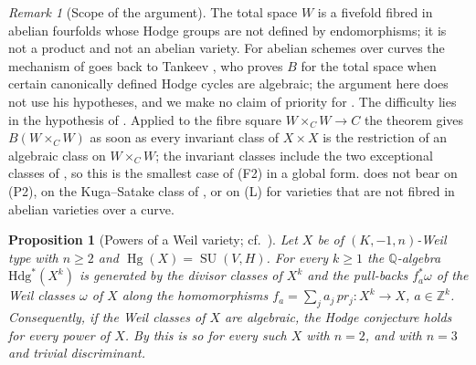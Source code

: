 \documentclass[11pt,reqno]{amsart}
\theoremstyle{plain}
\newtheorem{proposition}[theorem]{Proposition}
\theoremstyle{definition}
\theoremstyle{remark}
\newtheorem{remark}[theorem]{Remark}
\newcommand{\QQ}{\mathbb{Q}}
\newcommand{\ZZ}{\mathbb{Z}}
\newcommand{\Hdg}{\mathrm{Hdg}}
\DeclareMathOperator{\Hg}{Hg}
\DeclareMathOperator{\SU}{SU}
\begin{document}
\begin{remark}[Scope of the argument]\label{rem:newlefschetzscope}
The total space $W$ is a fivefold fibred in abelian fourfolds whose Hodge
groups are not defined by endomorphisms; it is not a product and not an
abelian variety. For abelian schemes over curves the mechanism of
 goes back to Tankeev \cite{Tan03}, who proves $B$
for the total space when certain canonically defined Hodge cycles are
algebraic; the argument here does not use his hypotheses, and we make no
claim of priority for . The difficulty lies in the hypothesis of
.
Applied to the fibre square $W\times_{C}W\to C$ the theorem gives
$B(W\times_{C}W)$ as soon as every invariant class of $X\times X$ is the
restriction of an algebraic class on $W\times_{C}W$; the invariant classes
include the two exceptional classes of , so this
is the smallest case of (F2) in a global form.  does not bear on (P2), on the Kuga--Satake
class of , or on \textup{(L)} for varieties that are not
fibred in abelian varieties over a curve.
\end{remark}

\begin{proposition}[Powers of a Weil variety; cf.\ \cite{Mil22}]\label{prop:powers}
Let $X$ be of $(K,-1,n)$-Weil type with $n\ge2$ and $\Hg(X)=\SU(V,H)$. For
every $k\ge1$ the $\QQ$-algebra $\Hdg^{*}(X^{k})$ is generated by the divisor
classes of $X^{k}$ and the pull-backs $f_{a}^{*}\omega$ of the Weil classes
$\omega$ of $X$ along the homomorphisms $f_{a}=\sum_{j}a_{j}\,pr_{j}\colon
X^{k}\to X$, $a\in\ZZ^{k}$. Consequently, if the Weil classes of $X$ are
algebraic, the Hodge conjecture holds for every power of $X$. By
\cite{Mar25a} this is so for every such $X$ with $n=2$, and with $n=3$ and
trivial discriminant.
\end{proposition}
\end{document}
